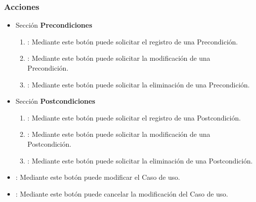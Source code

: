 \subsubsection{Acciones}
\begin{itemize}
 \item Sección \textbf{Precondiciones}
  \begin{enumerate}
	\item {}: Mediante este botón puede solicitar el registro de una Precondición.
	\item {}: Mediante este botón puede solicitar la modificación de una Precondición.
	\item {}: Mediante este botón puede solicitar la eliminación de una Precondición.
  \end{enumerate}
 \item Sección \textbf{Postcondiciones}
  \begin{enumerate}
	\item {}: Mediante este botón puede solicitar el registro de una Postcondición.
	\item {}: Mediante este botón puede solicitar la modificación de una Postcondición.
	\item {}: Mediante este botón puede solicitar la eliminación de una Postcondición.
  \end{enumerate}
  \item {}: Mediante este botón puede modificar el Caso de uso.
  \item {}: Mediante este botón puede cancelar la modificación del Caso de uso.
\end{itemize}


	
	
